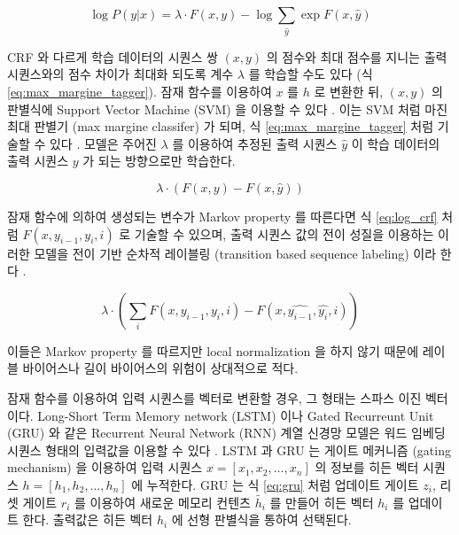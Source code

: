 \documentclass[11pt]{article}
\begin{document}
\begin{equation}
  \label{eq:log_crf}
  \log P(y \vert x) = \lambda \cdot F(x, y) - \log \sum_{\hat{y}} \exp F(x, \hat{y})
\end{equation}

CRF 와 다르게 학습 데이터의 시퀀스 쌍 $(x, y)$ 의 점수와 최대 점수를 지니는 출력 시퀀스와의 점수 차이가 최대화 되도록 계수 $\lambda$ 를 학습할 수도 있다 (식 \ref{eq:max_margine_tagger}).
잠재 함수를 이용하여 $x$ 를 $h$ 로 변환한 뒤, $(x, y)$ 의 판별식에 Support Vector Machine (SVM) \citep{Cortes1995} 을 이용할 수 있다 \citep{tsochantaridis2005large}.
이는 SVM 처럼 마진 최대 판별기 (max margine classifer) 가 되며, 식 \ref{eq:max_margine_tagger} 처럼 기술할 수 있다 \citep{taskar2004max}.
모델은 주어진 $\lambda$ 를 이용하여 추정된 출력 시퀀스 $\hat{y}$ 이 학습 데이터의 출력 시퀀스 $y$ 가 되는 방향으로만 학습한다.

\begin{equation}
  \label{eq:max_margine_tagger}
  \lambda \cdot \left( F(x, y) - F(x, \hat{y}) \right)
\end{equation}

잠재 함수에 의하여 생성되는 변수가 Markov property 를 따른다면 식 \ref{eq:log_crf} 처럼 $F(x, y_{i-1}, y_{i}, i)$ 로 기술할 수 있으며, 출력 시퀀스 값의 전이 성질을 이용하는 이러한 모델을 전이 기반 순차적 레이블링 (transition based sequence labeling) 이라 한다 \citep{bohnet2012transition}.

\begin{equation}
  \label{eq:transition_based_tagger_i}
  \lambda \cdot \left( \sum_i F(x, y_{i-1}, y_i, i) - F(x, \hat{y_{i-1}}, \hat{y_i}, i) \right)
\end{equation}

이들은 Markov property 를 따르지만 local normalization 을 하지 않기 때문에 레이블 바이어스나 길이 바이어스의 위험이 상대적으로 적다.

잠재 함수를 이용하여 입력 시퀀스를 벡터로 변환할 경우, 그 형태는 스파스 이진 벡터이다.
Long-Short Term Memory network (LSTM) 이나 Gated Recurreunt Unit (GRU) 와 같은 Recurrent Neural Network (RNN) 계열 신경망 모델은 워드 임베딩 시퀀스 형태의 입력값을 이용할 수 있다 \citep{cho2014learning, hochreiter1997long}.
LSTM 과 GRU 는 게이트 메커니즘 (gating mechanism) 을 이용하여 입력 시퀀스 $x = [x_1, x_2, \dots, x_n]$ 의 정보를 히든 벡터 시퀀스 $h = [h_1, h_2, \dots, h_n]$ 에 누적한다.
GRU 는 식 \ref{eq:gru} 처럼 업데이트 게이트 $z_i$, 리셋 게이트 $r_i$ 를 이용하여 새로운 메모리 컨텐츠 $\tilde{h_i}$ 를 만들어 히든 벡터 $h_i$ 를 업데이트 한다.
출력값은 히든 벡터 $h_i$ 에 선형 판별식을 통하여 선택된다.
\end{document}
